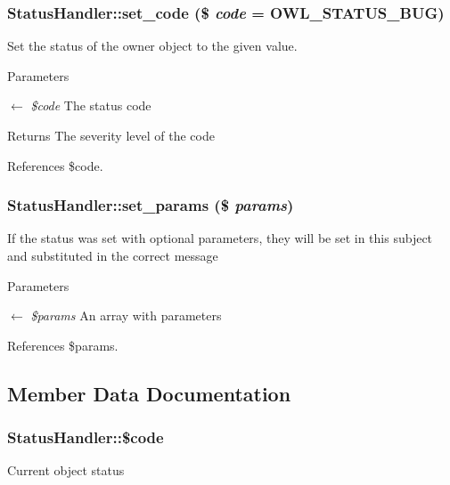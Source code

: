 \subsubsection[{set\_\-code}]{\setlength{\rightskip}{0pt plus 5cm}StatusHandler::set\_\-code (\$ {\em code} = {\ttfamily OWL\_\-STATUS\_\-BUG})}\label{classStatusHandler_a748d462386322a552aa798f951258c91}
Set the status of the owner object to the given value.


\begin{DoxyParams}{Parameters}
\item[\mbox{$\leftarrow$} {\em \$code}]The status code \end{DoxyParams}
\begin{DoxyReturn}{Returns}
The severity level of the code 
\end{DoxyReturn}


References \$code.

\subsubsection[{set\_\-params}]{\setlength{\rightskip}{0pt plus 5cm}StatusHandler::set\_\-params (\$ {\em params})}\label{classStatusHandler_ac35544d3ad8a435f69db0965ed674428}
If the status was set with optional parameters, they will be set in this subject and substituted in the correct message


\begin{DoxyParams}{Parameters}
\item[\mbox{$\leftarrow$} {\em \$params}]An array with parameters \end{DoxyParams}


References \$params.



\subsection{Member Data Documentation}
\subsubsection[{\$code}]{\setlength{\rightskip}{0pt plus 5cm}StatusHandler::\$code}\label{classStatusHandler_ab74e826d2401345eb20b11fe7d78aa45}
Current object status 

